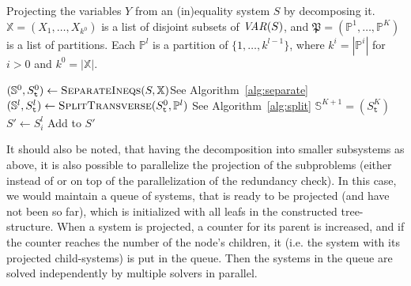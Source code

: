 \begin{algorithm}
\caption{Projecting the variables $Y$ from an (in)equality system $S$ by decomposing it.
$\mathbb{X}=(X_1,\ldots, X_{k^0})$ is a list of disjoint subsets of $\mathit{VAR}(S)$, and 
$\mathfrak{P}=(\mathbb{P}^1, \ldots, \mathbb{P}^K)$ is a list of partitions. Each $\mathbb{P}^l$ is a partition of $\{1,\ldots, k^{l-1}\}$, where $k^{i}=|\mathbb{P}^i|$ for $i>0$ and $k^0 = |\mathbb{X}|$.}
\label{alg:solve}
\begin{algorithmic}[1]
	\State $(\mathbb{S}^0,S_\texttt{t}^0) \gets \Call{SeparateIneqs}{S,\mathbb{X}}$\Comment See Algorithm~\ref{alg:separate}
		\State $(\mathbb{S}^l,S^l_\texttt{t})\gets\Call{SplitTransverse}{S^0_\texttt{t},\mathbb{P}^l}$ \Comment See Algorithm~\ref{alg:split}
	\EndFor
	\State $\mathbb{S}^{K+1} =(S^K_\texttt{t})$
	\State\Return{}
\EndFunction
\Statex
{}
	\State \Return {} \label{line:project1}
\Else
	\State $S'\gets S^l_i$
		\State Add  to $S'$ 
	\EndFor
	\State\Return {}\label{line:project2}
\EndIf 
\EndFunction
\end{algorithmic}
\end{algorithm}
%
%
%
It should also be noted, that having the decomposition into smaller subsystems as above, it is also possible to parallelize the projection of the subproblems (either instead of or on top of the parallelization of the redundancy check). In this case, we would maintain a queue of systems, that is ready to be projected (and have not been so far), which is initialized with all leafs in the constructed tree-structure. When a system is projected, a counter for its parent is increased, and if the counter reaches the number of the node's children, it (i.e. the system with its projected child-systems) is put in the queue. Then the systems in the queue are solved independently by multiple solvers in parallel.

